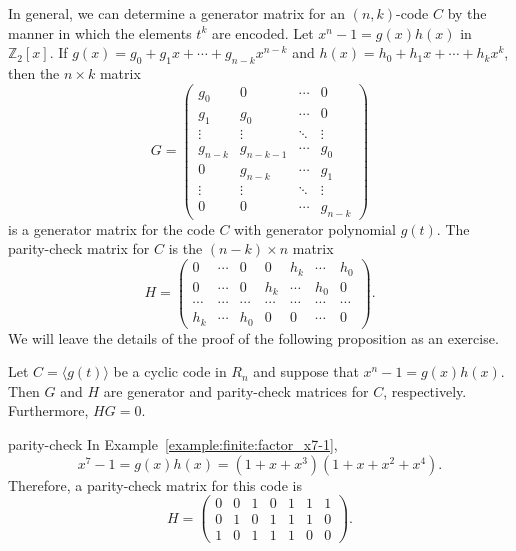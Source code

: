  
In general, we can determine a generator matrix for an $(n, k)$-code $C$ by the manner in which the elements $t^k$ are encoded. Let $x^n - 1 = g(x) h(x)$ in ${\mathbb Z}_2[x]$. If $g(x) = g_0 + g_1 x + \cdots + g_{n-k} x^{n-k}$ and $h(x) = h_0 + h_1 x +  \cdots + h_k x^k$, then the $n \times k$ matrix
\[
G = 
\begin{pmatrix}
g_0 & 0   & \cdots & 0 \\
g_1 & g_0 & \cdots & 0 \\
\vdots & \vdots &\ddots & \vdots \\
g_{n-k}   & g_{n-k-1} & \cdots & g_0 \\
0   & g_{n-k} & \cdots & g_{1} \\
\vdots & \vdots & \ddots & \vdots \\
0   & 0 & \cdots & g_{n-k}
\end{pmatrix}
\]
is a generator matrix for the code $C$ with generator polynomial $g(t)$.  The parity-check matrix for $C$ is the $(n-k) \times n$ matrix 
\[
H =
\begin{pmatrix}
0   & \cdots & 0   & 0      & h_k    & \cdots & h_0 \\
0   & \cdots & 0 & h_k & \cdots & h_0    & 0 \\
\cdots  & \cdots & \cdots  & \cdots &  \cdots &  \cdots & \cdots \\
h_k & \cdots & h_0 & 0      & 0      & \cdots & 0 
\end{pmatrix}.
\]
We will leave the details of the proof of the following proposition as an exercise.  

\begin{proposition}
Let $C = \langle g(t) \rangle$ be a cyclic code in $R_n$ and suppose that $x^n - 1 = g(x) h(x)$.  Then $G$ and $H$ are generator and parity-check matrices  for $C$, respectively.  Furthermore, $HG = 0$. 
\end{proposition}


\begin{example}{parity-check}
In Example~\ref{example:finite:factor_x7-1},
\[
x^7 - 1 = g(x) h(x) = (1 + x + x^3)(1 + x + x^2 + x^4).
\]
Therefore, a parity-check matrix for this code is
\[
H =
\begin{pmatrix}
0 & 0 & 1 & 0 & 1 & 1 & 1 \\
0 & 1 & 0 & 1 & 1 & 1 & 0 \\
1 & 0 & 1 & 1 & 1 & 0 & 0
\end{pmatrix}.
\]
\end{example}


